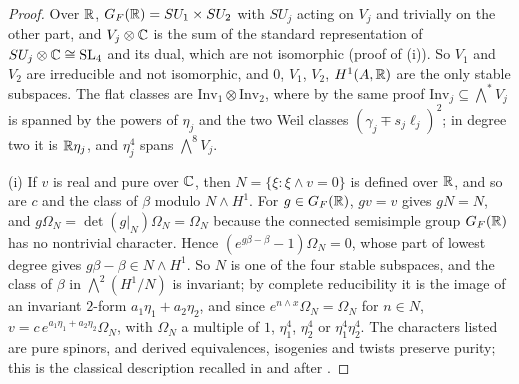 \begin{proof}
Over $\mathbb{R}$, $G_{F}(\mathbb{R})=SU_{1}\times SU_{2}$ with $SU_{j}$ acting on $V_{j}$
and trivially on the other part, and $V_{j}\otimes\mathbb{C}$ is the sum of the
standard representation of $SU_{j}\otimes\mathbb{C}\cong\operatorname{SL}_{4}$ and its dual, which
are not isomorphic (proof of (i)). So $V_{1}$ and
$V_{2}$ are irreducible and not isomorphic, and $0$, $V_{1}$, $V_{2}$,
$H^{1}(A,\mathbb{R})$ are the only stable subspaces. The flat classes are
$\mathrm{Inv}_{1}\otimes\mathrm{Inv}_{2}$, where by the same proof
$\mathrm{Inv}_{j}\subseteq\bigwedge^{*}V_{j}$ is spanned by the powers of
$\eta_{j}$ and the two Weil classes $(\gamma_{j}\mp s_{j}\ell_{j})^{2}$; in
degree two it is $\mathbb{R}\eta_{j}$, and $\eta_{j}^{4}$ spans $\bigwedge^{8}V_{j}$.

(i) If $v$ is real and pure over $\mathbb{C}$, then $N=\{\xi:\xi\wedge v=0\}$ is
defined over $\mathbb{R}$, and so are $c$ and the class of $\beta$ modulo
$N\wedge H^{1}$. For $g\in G_{F}(\mathbb{R})$, $gv=v$ gives $gN=N$, and
$g\Omega_{N}=\det(g|_{N})\Omega_{N}=\Omega_{N}$ because the connected
semisimple group $G_{F}(\mathbb{R})$ has no nontrivial character. Hence
$(e^{g\beta-\beta}-1)\Omega_{N}=0$, whose part of lowest degree gives
$g\beta-\beta\in N\wedge H^{1}$. So $N$ is one of the four stable subspaces,
and the class of $\beta$ in $\bigwedge^{2}(H^{1}/N)$ is invariant; by complete
reducibility it is the image of an invariant $2$-form
$a_{1}\eta_{1}+a_{2}\eta_{2}$, and since $e^{n\wedge x}\Omega_{N}=\Omega_{N}$
for $n\in N$, $v=c\,e^{a_{1}\eta_{1}+a_{2}\eta_{2}}\Omega_{N}$, with
$\Omega_{N}$ a multiple of $1$, $\eta_{1}^{4}$, $\eta_{2}^{4}$ or
$\eta_{1}^{4}\eta_{2}^{4}$. The characters listed are pure spinors, and
derived equivalences, isogenies and twists preserve purity; this is the
classical description recalled in  and after
.


\end{proof}

